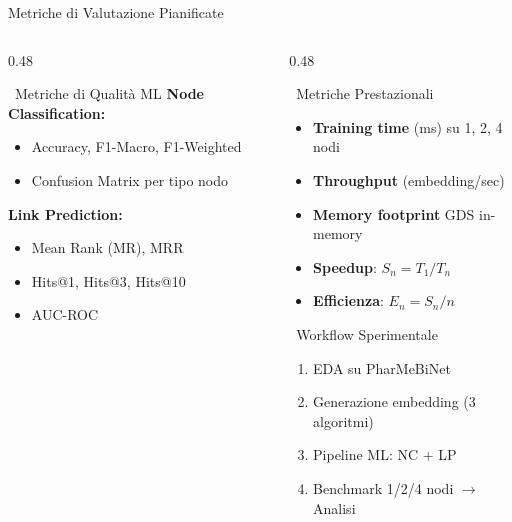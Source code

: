 \documentclass[aspectratio=169]{beamer}
\newcommand{\icoCogs}{\faCogs}
\newcommand{\icoRoad}{\faRoad}
\newcommand{\icoStar}{\faStar}
\newcommand{\icoChart}{\faChartBar}
\newcommand{\icoCogs}{\ding{102}}
\newcommand{\icoRoad}{\ding{229}}
\newcommand{\icoStar}{\ding{72}}
\newcommand{\icoChart}{\ding{115}}
\begin{document}
\begin{frame}{Metriche di Valutazione Pianificate}
  \begin{columns}[T]
    \begin{column}{0.48\textwidth}
      \begin{block}{\icoChart\ Metriche di Qualit\`a ML}
        \footnotesize
        \textbf{Node Classification:}
        \begin{itemize}
          \setlength{\itemsep}{1pt}
          \item[\icoStar] Accuracy, F1-Macro, F1-Weighted
          \item[\icoStar] Confusion Matrix per tipo nodo
        \end{itemize}
        \vspace{4pt}
        \textbf{Link Prediction:}
        \begin{itemize}
          \setlength{\itemsep}{1pt}
          \item[\icoStar] Mean Rank (MR), MRR
          \item[\icoStar] Hits@1, Hits@3, Hits@10
          \item[\icoStar] AUC-ROC
        \end{itemize}
      \end{block}
    \end{column}
    \begin{column}{0.48\textwidth}
      \begin{block}{\icoCogs\ Metriche Prestazionali}
        \footnotesize
        \begin{itemize}
          \setlength{\itemsep}{1pt}
          \item[\icoStar] \textbf{Training time} (ms) su 1, 2, 4 nodi
          \item[\icoStar] \textbf{Throughput} (embedding/sec)
          \item[\icoStar] \textbf{Memory footprint} GDS in-memory
          \item[\icoStar] \textbf{Speedup}: $S_n = T_1 / T_n$
          \item[\icoStar] \textbf{Efficienza}: $E_n = S_n / n$
        \end{itemize}
      \end{block}
      \vspace{-0.1cm}
      \begin{exampleblock}{\icoRoad\ Workflow Sperimentale}
        \footnotesize
        \begin{enumerate}
          \setlength{\itemsep}{1pt}
          \item EDA su PharMeBiNet
          \item Generazione embedding (3 algoritmi)
          \item Pipeline ML: NC + LP
          \item Benchmark 1/2/4 nodi $\to$ Analisi
        \end{enumerate}
      \end{exampleblock}
    \end{column}
  \end{columns}
\end{frame}
\end{document}
